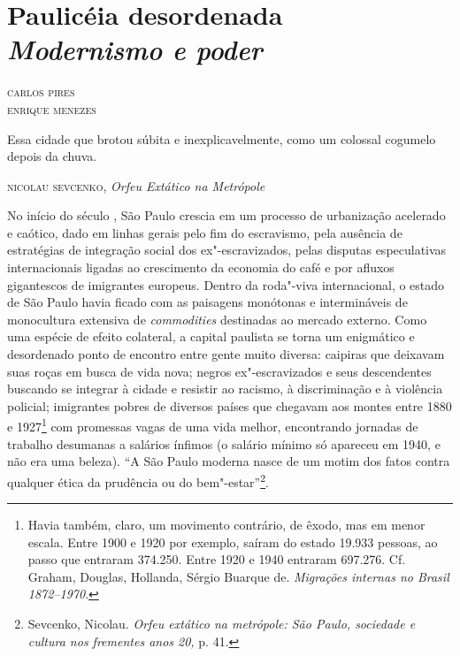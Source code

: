 \chapter*{Paulicéia desordenada\\ \emph{Modernismo e poder}}


\begin{flushright}
\textsc{carlos pires\\ enrique menezes}
\end{flushright}

\epigraph{Essa cidade que brotou súbita e inexplicavelmente,
como um colossal cogumelo depois da chuva.}{\textsc{nicolau sevcenko}, \emph{Orfeu Extático na Metrópole}}

No início do século , São Paulo crescia em um processo de urbanização
acelerado e caótico, dado em linhas gerais pelo fim do escravismo, pela
ausência de estratégias de integração social dos ex"-escravizados, pelas
disputas especulativas internacionais ligadas ao crescimento da economia
do café e por afluxos gigantescos de imigrantes europeus. Dentro da
roda"-viva internacional, o estado de São Paulo havia ficado com as paisagens monótonas e intermináveis de
monocultura extensiva de \emph{commodities} destinadas ao mercado
externo. Como uma espécie de efeito colateral, a capital paulista se
torna um enigmático e desordenado ponto de encontro entre gente muito
diversa: caipiras que deixavam suas roças em busca de vida nova; negros
ex"-escravizados e seus descendentes buscando se integrar à cidade e
resistir ao racismo, à discriminação e à violência policial; imigrantes
pobres de diversos países que chegavam aos montes entre 1880 e
1927\footnote{Havia também, claro, um movimento contrário, de êxodo, mas
  em menor escala. Entre 1900 e 1920 por exemplo, saíram do estado
  19.933 pessoas, ao passo que entraram 374.250. Entre 1920 e 1940
  entraram 697.276. Cf. Graham, Douglas, Hollanda, Sérgio Buarque de.
  \emph{Migrações internas no Brasil 1872--1970}.} com promessas vagas de
uma vida melhor, encontrando jornadas de trabalho desumanas a salários
ínfimos (o salário mínimo só apareceu em 1940, e não era uma beleza).
``A São Paulo moderna nasce de um motim dos fatos contra qualquer ética
da prudência ou do bem"-estar''\footnote{Sevcenko, Nicolau. \emph{Orfeu
  extático na metrópole: São Paulo, sociedade e cultura nos frementes
  anos 20,} p. 41.}.

